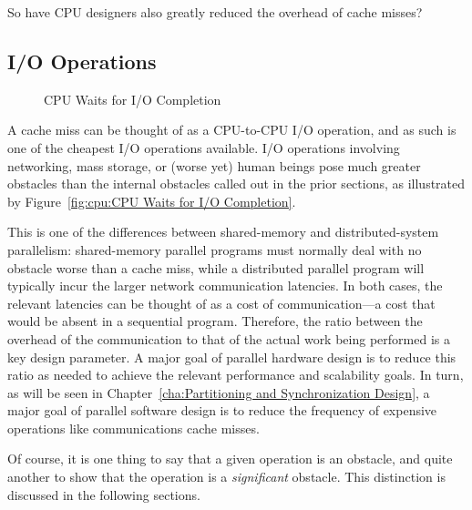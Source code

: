 \QuickQuiz{}
	So have CPU designers also greatly reduced the overhead of
	cache misses?
 \QuickQuizEnd

\subsection{I/O Operations}
\label{sec:cpu:I/O Operations}

\begin{figure}[tb]
\begin{center}
\end{center}
\caption{CPU Waits for I/O Completion}
\end{figure}

A cache miss can be thought of as a CPU-to-CPU I/O operation, and as
such is one of the cheapest I/O operations available.
I/O operations involving networking, mass storage, or (worse yet) human
beings pose much greater obstacles than the internal obstacles called
out in the prior sections,
as illustrated by
Figure~\ref{fig:cpu:CPU Waits for I/O Completion}.

This is one of the differences between shared-memory and distributed-system
parallelism: shared-memory parallel programs must normally deal with no
obstacle worse than a cache miss, while a distributed parallel program
will typically incur the larger network communication latencies.
In both cases, the relevant latencies can be thought of as a cost of
communication---a cost that would be absent in a sequential program.
Therefore, the ratio between the overhead of the communication to
that of the actual work being performed is a key design parameter.
A major goal of parallel hardware design is to reduce this ratio as
needed to achieve the relevant performance and scalability goals.
In turn, as will be seen in
Chapter~\ref{cha:Partitioning and Synchronization Design},
a major goal of parallel software design is to reduce the
frequency of expensive operations like communications cache misses.

Of course, it is one thing to say that a given operation is an obstacle,
and quite another to show that the operation is a \emph{significant}
obstacle.
This distinction is discussed in the following sections.
